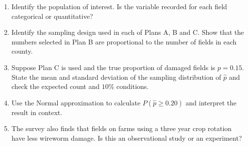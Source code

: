 \documentclass[11pt]{article}
\begin{document}
\begin{enumerate}
  \item Identify the population of interest. Is the variable recorded for each field categorical or quantitative?
  \item Identify the sampling design used in each of Plans A, B and C. Show that the numbers selected in Plan B are proportional to the number of fields in each county.
  \item Suppose Plan C is used and the true proportion of damaged fields is $p=0.15$. State the mean and standard deviation of the sampling distribution of $\hat p$ and check the expected count and $10\%$ conditions.
  \item Use the Normal approximation to calculate $P(\hat p\geq0.20)$ and interpret the result in context.
  \item The survey also finds that fields on farms using a three year crop rotation have less wireworm damage. Is this an observational study or an experiment?
\end{enumerate}
\end{document}

